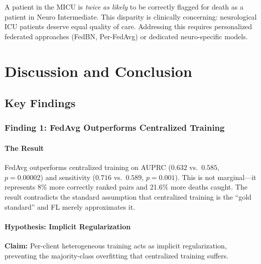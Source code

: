 \documentclass[11pt,a4paper]{report}
\begin{document}
A patient in the MICU is \emph{twice as likely} to be correctly flagged for death as a patient in Neuro Intermediate. This disparity is clinically concerning: neurological ICU patients deserve equal quality of care. Addressing this requires personalized federated approaches (FedBN, Per-FedAvg) or dedicated neuro-specific models.


\part{Discussion and Conclusion}

\chapter{Key Findings}

\section{Finding 1: FedAvg Outperforms Centralized Training}
\label{sec:why_fedavg_wins}

\subsection{The Result}
FedAvg outperforms centralized training on AUPRC ($0.632$ vs.\ $0.585$, $p = 0.00002$) and sensitivity ($0.716$ vs.\ $0.589$, $p = 0.001$). This is not marginal---it represents 8\% more correctly ranked pairs and 21.6\% more deaths caught. The result contradicts the standard assumption that centralized training is the ``gold standard'' and FL merely approximates it.

\subsection{Hypothesis: Implicit Regularization}
\textbf{Claim:} Per-client heterogeneous training acts as implicit regularization, preventing the majority-class overfitting that centralized training suffers.
\end{document}
